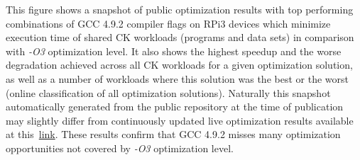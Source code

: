 This figure shows a snapshot of public optimization results 
with top performing combinations of GCC 4.9.2 compiler flags
on RPi3 devices which minimize execution time of shared CK workloads 
(programs and data sets) in comparison with \textit{-O3} optimization level.
%
It also shows the highest speedup and the worse degradation achieved
across all CK workloads for a given optimization solution, as well
as a number of workloads where this solution was the best or the worst
(online classification of all optimization solutions).
%
Naturally this snapshot automatically generated from the public repository 
at the time of publication may slightly differ from continuously updated 
live optimization results available at this~\href{http://cknowledge.org/repo/web.php?template=cknowledge&wcid=8289e0cf24346aa7:d24a4fde9f120e10}{link}.
%
These results confirm that GCC 4.9.2 misses many optimization opportunities 
not covered by \textit{-O3} optimization level.

